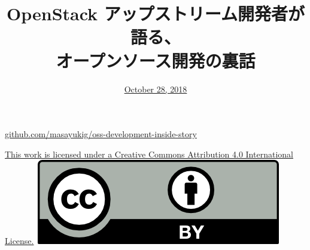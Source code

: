 \documentclass[aspectratio=169,11pt,hyperref={colorlinks=true}]{beamer}
\author[Masayuki Igawa]{%
    \texorpdfstring{%
        \begin{columns}
        \column{.7\linewidth}
            \centering
            Masayuki Igawa: \href{mailto:masayuki@igawa.io}{masayuki@igawa.io}\\
            \texttt{masayukig on
              \href{https://freenode.net/}{Freenode},
              \href{https://github.com/masayukig}{GitHub},
              \href{https://twitter.com/masayukig}{Twitter},
              \href{https://www.linkedin.com/in/masayukig/}{LinkedIn}}
        \end{columns}
        }
    {Masayuki Igawa}
}
\date{\href{https://events.opensuse.org/conference/summitasia18/program/proposal/2101}{October 28, 2018}}
\title[oss-development-inside-story
  \hspace{4em}\insertframenumber/\inserttotalframenumber]{OpenStack アップストリーム開発者が語る、\\
   オープンソース開発の裏話}
\begin{document}
{%
\begin{frame}[noframenumbering]
  \hypersetup{colorlinks,urlcolor=susedark}
  \titlepage{}
  \centering
  \@place \par
  \href{https://github.com/masayukig/oss-development-inside-story}{github.com/masayukig/oss-development-inside-story}
  \vspace{1em}
  \begin{flushright}
    \tiny\href{https://creativecommons.org/licenses/by/4.0/}{This work
      is licensed under a Creative Commons Attribution 4.0
      International License.}~\includegraphics[scale=0.3]{cc_by.png}
  \end{flushright}
\end{frame}
}
\end{document}

